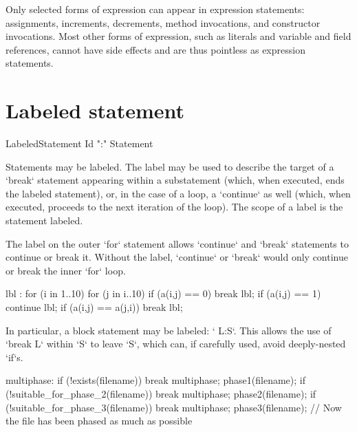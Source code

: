 Only selected forms of expression can appear in expression statements:
assignments, increments, decrements, method invocations, and constructor
invocations. Most other forms of expression, such as literals and variable and
field references, cannot have side effects and are thus pointless as
expression statements.


\section{Labeled statement}


\begin{bbgrammar}
    LabeledStatement \: Id \xcd":" Statement 
\end{bbgrammar}


Statements may be labeled. The label may be used to describe the target of a
\xcd`break` statement appearing within a substatement (which, when executed,
ends the labeled statement), or, in the case of a loop, a \xcd`continue` as
well (which, when executed, proceeds to the next iteration of the loop). The
scope of a label is the statement labeled.

\begin{ex}
The label on the outer \xcd`for` statement allows \xcd`continue` and
\xcd`break` statements to continue or break it.  Without the label,
\xcd`continue` or \xcd`break` would only continue or break the inner \xcd`for`
loop. 
\begin{xten}
lbl : for (i in 1..10) {
   for (j in i..10) {  
      if (a(i,j) == 0) break lbl;
      if (a(i,j) == 1) continue lbl;
      if (a(i,j) == a(j,i)) break lbl;
   }
}
\end{xten}
\end{ex}

In particular, a block statement may be labeled: \xcd` L:{S}`.  This allows
the use of \xcd`break L` within \xcd`S` to leave \xcd`S`, which can, if
carefully used, avoid deeply-nested \xcd`if`s. 

\begin{ex}
\begin{xten}
multiphase: {
  if (!exists(filename)) break multiphase;
  phase1(filename);
  if (!suitable_for_phase_2(filename)) break multiphase;
  phase2(filename);
  if (!suitable_for_phase_3(filename)) break multiphase;
  phase3(filename);
}
// Now the file has been phased as much as possible
\end{xten}
\end{ex}


